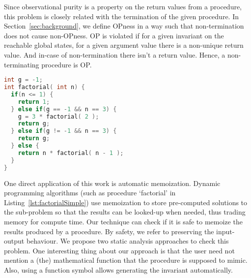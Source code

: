 \documentclass{llncs}
\begin{document}
  

Since observational purity is a property on the return values from a
procedure, this problem is closely related with the termination of the
given procedure. In Section~\ref{sec:background}, we define OPness in
a way such that non-termination does not cause non-OPness. OP is
violated if for a given invariant on the reachable global states, for
a given argument value there is a non-unique return value. And in-case
of non-termination there isn't a return value. Hence, a
non-terminating procedure is OP.

\begin{lstlisting}[language=c, caption= {Procedure `factorial' :
      returns factorial of `n' and memoizes result for argument value
      `3'.}, label=lst:factorialSimple]
int g = -1;
int factorial( int n) {
  if(n <= 1) {
    return 1;
  } else if(g == -1 && n == 3) {
    g = 3 * factorial( 2 );
    return g;
  } else if(g != -1 && n == 3) {
    return g;
  } else {
    return n * factorial( n - 1 );
  }
}
\end{lstlisting}

One direct application of this work is automatic memoization.  Dynamic
programming algorithms (such as procedure `factorial' in
Listing~\ref{lst:factorialSimple}) use memoization to store
pre-computed solutions to the sub-problem so that the results can be
looked-up when needed, thus trading memory for compute time. Our
technique can check if it is safe to memoize the results produced by a
procedure. By safety, we refer to preserving the input-output
behaviour. We propose two static analysis approaches to check this
problem. One interesting thing about our approach is that the user
need not mention a (the) mathematical function that the procedure is
supposed to mimic. Also, using a function symbol allows generating the
invariant automatically.

\end{document}
